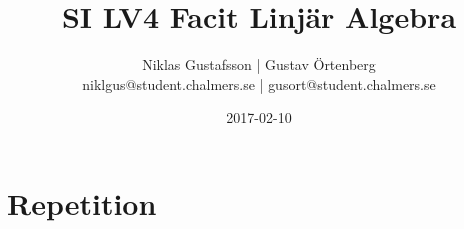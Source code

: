 \documentclass{article}
\title{SI LV4 Facit Linjär Algebra}
\author{Niklas Gustafsson | Gustav Örtenberg  \\ \small{niklgus@student.chalmers.se} | \small{gusort@student.chalmers.se}}
\date{2017-02-10}
\begin{document}
\maketitle
\section*{Repetition}


\section{}


\section{}


\section{}


\section{}


\section{}


\section{}

\end{document}
